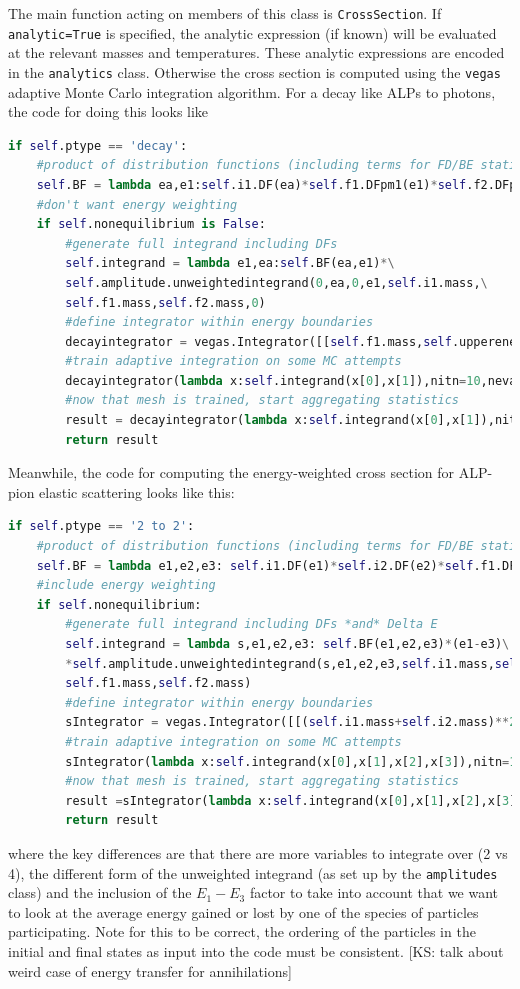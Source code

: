 \documentclass[superscriptaddress,nofootinbib,notitlepage,onecolumn]{revtex4-1}
\newcommand{\ks}[1]{{\color{magenta} [KS: #1]}}
\newcommand{\code}[1]{\texttt{#1}}
\begin{document}
The main function acting on members of this class is \code{CrossSection}. If \code{analytic=True} is specified, the analytic expression (if known) will be evaluated at the relevant masses and temperatures. These analytic expressions are encoded in the  \code{analytics} class. Otherwise the cross section is computed using the \code{vegas} adaptive Monte Carlo integration algorithm. For a decay like ALPs to photons, the code for doing this looks like 
\begin{lstlisting}[language=Python]
if self.ptype == 'decay':
	#product of distribution functions (including terms for FD/BE statistics)
	self.BF = lambda ea,e1:self.i1.DF(ea)*self.f1.DFpm1(e1)*self.f2.DFpm1(ea-e1)
	#don't want energy weighting
	if self.nonequilibrium is False:
		#generate full integrand including DFs
		self.integrand = lambda e1,ea:self.BF(ea,e1)*\
		self.amplitude.unweightedintegrand(0,ea,0,e1,self.i1.mass,\
		self.f1.mass,self.f2.mass,0)
		#define integrator within energy boundaries
		decayintegrator = vegas.Integrator([[self.f1.mass,self.upperenergy],[self.i1.mass,self.upperenergy]])
		#train adaptive integration on some MC attempts
		decayintegrator(lambda x:self.integrand(x[0],x[1]),nitn=10,neval=self.nevals)
		#now that mesh is trained, start aggregating statistics
		result = decayintegrator(lambda x:self.integrand(x[0],x[1]),nitn=10,neval=self.nevals)
		return result 
\end{lstlisting}
Meanwhile, the code for computing the energy-weighted cross section for ALP-pion elastic scattering looks like this:
\begin{lstlisting}[language=Python]
if self.ptype == '2 to 2':
	#product of distribution functions (including terms for FD/BE statistics)
	self.BF = lambda e1,e2,e3: self.i1.DF(e1)*self.i2.DF(e2)*self.f1.DFpm1(e3)*self.f2.DFpm1(e1+e2-e3)
	#include energy weighting
	if self.nonequilibrium:
		#generate full integrand including DFs *and* Delta E
		self.integrand = lambda s,e1,e2,e3: self.BF(e1,e2,e3)*(e1-e3)\
		*self.amplitude.unweightedintegrand(s,e1,e2,e3,self.i1.mass,self.i2.mass,\
		self.f1.mass,self.f2.mass)
		#define integrator within energy boundaries
		sIntegrator = vegas.Integrator([[(self.i1.mass+self.i2.mass)**2,4*self.upperenergy**2],[self.i1.mass,self.upperenergy],[self.i2.mass,self.upperenergy],[self.f1.mass,self.upperenergy]])
		#train adaptive integration on some MC attempts
		sIntegrator(lambda x:self.integrand(x[0],x[1],x[2],x[3]),nitn=10, neval=self.nevals)
		#now that mesh is trained, start aggregating statistics
		result =sIntegrator(lambda x:self.integrand(x[0],x[1],x[2],x[3]),nitn=10, neval=self.nevals)
		return result
\end{lstlisting}
where the key differences are that there are more variables to integrate over (2 vs 4), the different form of the unweighted integrand (as set up by the \code{amplitudes} class) and the inclusion of the $E_1 - E_3$ factor to take into account that we want to look at the average energy gained or lost by one of the species of particles participating. Note for this to be correct, the ordering of the particles in the initial and final states as input into the code must be consistent.
\ks{talk about weird case of energy transfer for annihilations}
\end{document}
